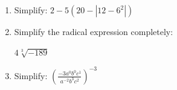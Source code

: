 \documentclass[11pt]{article}
\begin{document}
\begin{enumerate}

% 

\item %
\providecommand{\stxKnowl}{}\renewcommand{\stxKnowl}[1]{#1}
\providecommand{\stxOuttro}{}\renewcommand{\stxOuttro}[1]{#1}
\providecommand{\stxTitle}{}\renewcommand{\stxTitle}[1]{#1}
\renewcommand{\stxOuttro}[1]{}
\stxKnowl{
 Simplify: \(2 - 5( 20 - |12 - 6^2| )\) 

\stxOuttro{
SOLUTION

 \(2 - 5( 20 - |12 - 6^2| )\) 

 \(= 2 - 5( 20 - |12 - 36| )\) 

 \(= 2 - 5( 20 - |-24| )\) 

 \(= 2 - 5( 20 - 24 )\) 

 \(= 2 - 5( -4 )\) 

 \(= 2 - ( -20 )\) 

 \(= \boxed{ 22 }\) 

}
}

\newpage

% 

\item %
\providecommand{\stxKnowl}{}\renewcommand{\stxKnowl}[1]{#1}
\providecommand{\stxOuttro}{}\renewcommand{\stxOuttro}[1]{#1}
\providecommand{\stxTitle}{}\renewcommand{\stxTitle}[1]{#1}
\renewcommand{\stxOuttro}[1]{}
\stxKnowl{
 Simplify the radical expression completely: 

 \(4 \sqrt[3]{ -189 }\) 

\stxOuttro{
SOLUTION

 \(4 \sqrt[3]{ -189 }\) 

 \(= 4 \cdot \sqrt[3]{ -27 \cdot 7 }\) 

 \(= 4 \cdot (-3) \sqrt[3]{ 7 }\) 

 \(= \boxed{ -12 \sqrt[3]{ 7 } }\) 

}
}

\newpage

% 

\item %
\providecommand{\stxKnowl}{}\renewcommand{\stxKnowl}[1]{#1}
\providecommand{\stxOuttro}{}\renewcommand{\stxOuttro}[1]{#1}
\providecommand{\stxTitle}{}\renewcommand{\stxTitle}[1]{#1}
\renewcommand{\stxOuttro}[1]{}
\stxKnowl{
 Simplify: \(\displaystyle \left( \frac{ -3 a^{0} b^{0} c^{1} }{ a^{-2} b^{3} c^{2} } \right)^{ -3 }\) 

}
\end{enumerate}
\end{document}
